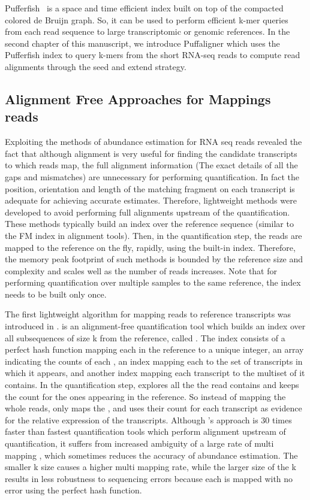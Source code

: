 Pufferfish~\citep{pufferfish} is a space and time efficient index built on 
top of the compacted colored de Bruijn graph. So, it can be used to perform 
efficient k-mer queries from each read sequence to large transcriptomic or 
genomic references. In the second chapter of this manuscript, we introduce 
Puffaligner which uses the Pufferfish index to query k-mers from the short 
RNA-seq reads to compute read alignments through the seed and extend strategy.

\subsection{Alignment Free Approaches for Mappings reads}\label{int:qm}
Exploiting the methods of abundance estimation for RNA seq reads revealed the 
fact that although alignment is very useful for finding the candidate transcripts 
to which reads map, the full alignment information (The exact details of all the 
gaps and mismatches) are unnecessary for performing quantification. In fact the 
position, orientation and length of the matching fragment on each transcript is 
adequate for achieving accurate estimates. Therefore, lightweight methods were 
developed to avoid performing full alignments upstream of the quantification. 
These methods typically build an index over the reference sequence (similar to 
the FM index in alignment tools). Then, in the quantification step, the reads 
are mapped to the reference on the fly, rapidly, using the built-in index. 
Therefore, the memory peak footprint of such methods is bounded by the reference 
size and complexity and scales well as the number of reads increases. Note that 
for performing quantification over multiple samples to the same reference, the 
index needs to be built only once.

The first lightweight algorithm for mapping reads to reference transcripts was 
introduced in \sailfish \citep{Patro2014Sailfish}. \sailfish is an alignment-free 
quantification tool which builds an index over all subsequences of size k from the 
reference, called \kmers. The \sailfish index consists of a perfect hash function 
mapping each \kmer in the reference to a unique integer, an array indicating the 
counts of each \kmer, an index mapping each \kmer to the set of transcripts 
in which it appears, and another index mapping each transcript to the multiset 
of \kmers it contains. In the quantification step, \sailfish explores all the 
\kmers the read contains and keeps the count for the ones appearing in the 
reference. So instead of mapping the whole reads, \sailfish only maps the \kmers, 
and uses their count for each transcript as evidence for the relative expression 
of the transcripts. Although \sailfish's approach is 30 times faster than fastest 
quantification tools which perform alignment upstream of quantification, 
it suffers from increased ambiguity of a large rate of multi mapping \kmers, 
which sometimes reduces the accuracy of abundance estimation. The smaller k size 
causes a higher multi mapping rate, while the larger size of the k results in 
less robustness to sequencing errors because each \kmer is mapped with no error 
using the perfect hash function.

